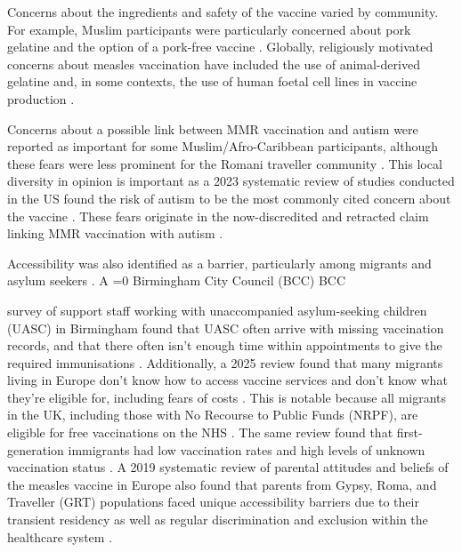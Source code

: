 \documentclass[12pt]{article}
\newcounter{bcc}
\newcommand{\bcc}{%
    \ifnum\value{bcc}=0
        \stepcounter{bcc}%
        Birmingham City Council (BCC)%
        \else
        BCC%
    \fi%
    \xspace
}
\newcounter{ukhsa}
\begin{document}
Concerns about the ingredients and safety of the vaccine varied by community. For example, Muslim participants were particularly concerned about pork gelatine and the option of a pork-free vaccine \cite{palmer_birmingham_measles_engagement_2024, smbc_community_engagement_learning_2025}. Globally, religiously motivated concerns about measles vaccination have included the use of animal-derived gelatine and, in some contexts, the use of human foetal cell lines in vaccine production \cite{wombwell2015religious}.

Concerns about a possible link between MMR vaccination and autism were reported as important for some Muslim/Afro-Caribbean participants, although these fears were less prominent for the Romani traveller community \cite{palmer_birmingham_measles_engagement_2024, smbc_community_engagement_learning_2025}. This local diversity in opinion is important as a 2023 systematic review of studies conducted in the US found the risk of autism to be the most commonly cited concern about the vaccine \cite{novilla2023parents}. These fears originate in the now-discredited and retracted claim linking MMR vaccination with autism \cite{wakefield1998retracted, godlee2011wakefield, gagnon2023science, madsen2002population}.

Accessibility was also identified as a barrier, particularly among migrants and asylum seekers \cite{bissett_measles_soft_intelligence_2024}. A \bcc survey of support staff working with unaccompanied asylum-seeking children (UASC) in Birmingham found that UASC often arrive with missing vaccination records, and that there often isn’t enough time within appointments to give the required immunisations \cite{kemishi_uasc_health_wellbeing_2025}. Additionally, a 2025 review found that many migrants living in Europe don’t know how to access vaccine services and don’t know what they’re eligible for, including fears of costs \cite{halliday2025vaccine}. This is notable because all migrants in the UK, including those with No Recourse to Public Funds (NRPF), are eligible for free vaccinations on the NHS \cite{nrpf_nhs_treatment_overview, ukhsa_migrant_immunisation_2022}. The same review found that first-generation immigrants had low vaccination rates and high levels of unknown vaccination status \cite{halliday2025vaccine}. A 2019 systematic review of parental attitudes and beliefs of the measles vaccine in Europe also found that parents from Gypsy, Roma, and Traveller (GRT) populations faced unique accessibility barriers due to their transient residency as well as regular discrimination and exclusion within the healthcare system \cite{wilder2020resurgence}.
\end{document}
